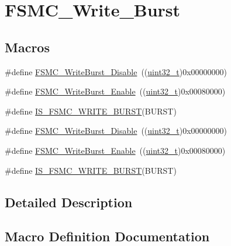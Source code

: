 \hypertarget{group___f_s_m_c___write___burst}{}\section{F\+S\+M\+C\+\_\+\+Write\+\_\+\+Burst}
\label{group___f_s_m_c___write___burst}
\subsection*{Macros}
\begin{DoxyCompactItemize}
\item 
\#define \hyperlink{group___f_s_m_c___write___burst_ga65a49ecd05b3a128e8908c6a625adae7}{F\+S\+M\+C\+\_\+\+Write\+Burst\+\_\+\+Disable}~((\hyperlink{_p_e___types_8h_a33594304e786b158f3fb30289278f5af}{uint32\+\_\+t})0x00000000)
\item 
\#define \hyperlink{group___f_s_m_c___write___burst_ga1b2b66a0eb42778c2cc9a05003cf7655}{F\+S\+M\+C\+\_\+\+Write\+Burst\+\_\+\+Enable}~((\hyperlink{_p_e___types_8h_a33594304e786b158f3fb30289278f5af}{uint32\+\_\+t})0x00080000)
\item 
\#define \hyperlink{group___f_s_m_c___write___burst_gab7b03a33fab765827832abbf07d01a10}{I\+S\+\_\+\+F\+S\+M\+C\+\_\+\+W\+R\+I\+T\+E\+\_\+\+B\+U\+R\+ST}(B\+U\+R\+ST)
\item 
\#define \hyperlink{group___f_s_m_c___write___burst_ga65a49ecd05b3a128e8908c6a625adae7}{F\+S\+M\+C\+\_\+\+Write\+Burst\+\_\+\+Disable}~((\hyperlink{_p_e___types_8h_a33594304e786b158f3fb30289278f5af}{uint32\+\_\+t})0x00000000)
\item 
\#define \hyperlink{group___f_s_m_c___write___burst_ga1b2b66a0eb42778c2cc9a05003cf7655}{F\+S\+M\+C\+\_\+\+Write\+Burst\+\_\+\+Enable}~((\hyperlink{_p_e___types_8h_a33594304e786b158f3fb30289278f5af}{uint32\+\_\+t})0x00080000)
\item 
\#define \hyperlink{group___f_s_m_c___write___burst_gab7b03a33fab765827832abbf07d01a10}{I\+S\+\_\+\+F\+S\+M\+C\+\_\+\+W\+R\+I\+T\+E\+\_\+\+B\+U\+R\+ST}(B\+U\+R\+ST)
\end{DoxyCompactItemize}


\subsection{Detailed Description}


\subsection{Macro Definition Documentation}
